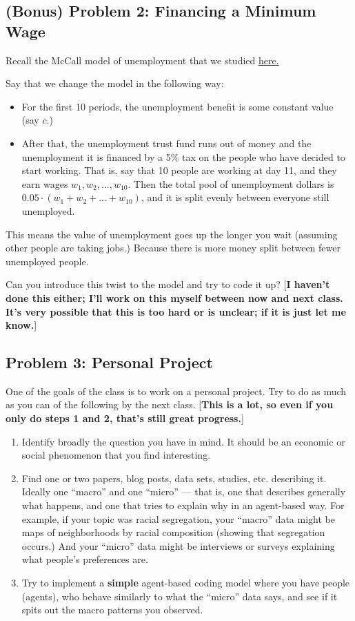 \documentclass[10pt, oneside]{amsart}
\DeclareMathOperator{\1}{\mathbbm{1}}
\newcommand{\skep}[1]{\textbf{\red #1}}
\newcommand{\red}{\color{red}}
\newcommand{\blue}{\color{blue}}
\begin{document}
\subsection*{(Bonus) Problem 2: Financing a Minimum Wage} Recall the McCall model of unemployment that we studied \href{https://julia.quantecon.org/dynamic_programming/mccall_model.html}{\blue here.}

Say that we change the model in the following way: 
\begin{itemize}
    \item For the first 10 periods, the unemployment benefit is some constant value (say $c$.)
    \item After that, the unemployment trust fund runs out of money and the unemployment it is financed by a 5\% tax on the people who have decided to start working. That is, say that 10 people are working at day 11, and they earn wages $w_1, w_2, ..., w_{10}$. Then the total pool of unemployment dollars is $0.05 \cdot (w_1 + w_2 + ... + w_{10})$, and it is split evenly between everyone still unemployed.
\end{itemize}

This means the value of unemployment goes up the longer you wait (assuming other people are taking jobs.) Because there is more money split between fewer unemployed people.

Can you introduce this twist to the model and try to code it up? [{\skep{I haven't done this either; I'll work on this myself between now and next class. It's very possible that this is too hard or is unclear; if it is just let me know.}}]

\subsection*{Problem 3: Personal Project} One of the goals of the class is to work on a personal project. Try to do as much as you can of the following by the next class. [\skep{This is a lot, so even if you only do steps 1 and 2, that's still great progress.}]
\begin{enumerate}
    \item Identify broadly the question you have in mind. It should be an economic or social phenomenon that you find interesting.
    \item Find one or two papers, blog posts, data sets, studies, etc. describing it. Ideally one ``macro'' and one ``micro'' --- that is, one that describes generally what happens, and one that tries to explain why in an agent-based way. 
    \subitem For example, if your topic was racial segregation, your ``macro'' data might be maps of neighborhoods by racial composition (showing that segregation occurs.) And your ``micro'' data might be interviews or surveys explaining what people's preferences are. 
    \item Try to implement a \textbf{simple} agent-based coding model where you have people (agents), who behave similarly to what the ``micro'' data says, and see if it spits out the macro patterns you observed.
\end{enumerate}
\end{document}
